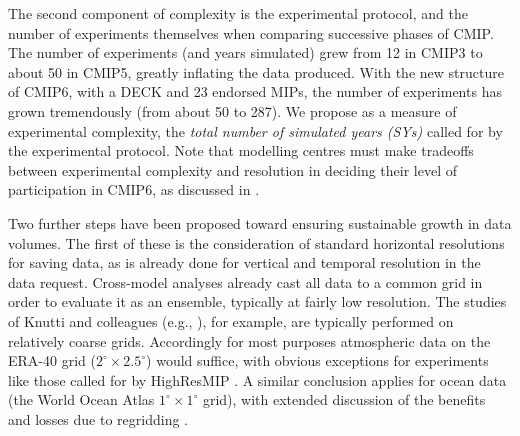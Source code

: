 \documentclass[gmd,manuscript]{copernicus}
\begin{document}
\begin{description}
  The second component of complexity is the experimental protocol, and 
  the number of experiments themselves when comparing successive phases of CMIP.
  The number of experiments (and years simulated) grew from 12 in CMIP3 to about 50
  in CMIP5, greatly inflating the data produced.
   With the new structure of CMIP6, with a DECK and 23 endorsed MIPs, the 
  number of experiments has grown tremendously (from about 50 to 287). 
  We propose as a measure of experimental
  complexity, the \emph{total number of simulated years (SYs)}
  called for by the experimental protocol. 
  Note that 
  modelling centres must make tradeoffs between experimental
  complexity and resolution in deciding their level of participation
  in CMIP6, as discussed in \cite{ref:balajietal2017}.
\end{description}

Two further steps have been proposed toward ensuring sustainable
growth in data volumes.
The first of these is the consideration of standard horizontal
resolutions for saving data, as is already done for vertical and
temporal resolution in the data request. Cross-model analyses already
cast all data to a common grid in order to evaluate it as an ensemble,
typically at fairly low resolution. The studies of Knutti and
colleagues (e.g., \cite{ref:knuttietal2017}), for example, are typically performed
on relatively coarse grids. Accordingly for most purposes
atmospheric data on the ERA-40 grid ($2^\circ\times 2.5^\circ$) would
suffice, with obvious exceptions for experiments like those called
for by HighResMIP \citep{ref:haarsmaetal2016}. A similar
conclusion applies for ocean data (the World Ocean Atlas
$1^\circ\times 1^\circ$ grid), with extended discussion of the
benefits and losses due to regridding
\citep[see][]{ref:griffiesetal2014,ref:griffiesetal2016}.
\end{document}
